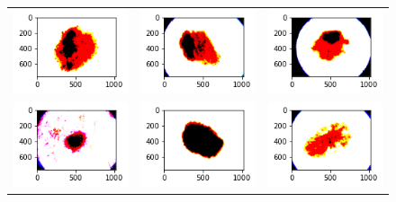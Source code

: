 \begin{figure}[!b]
\begin{tabular}{ccc}
        \includegraphics[width=4cm]{../Plots/THR/filtered_6.png} &
        \includegraphics[width=4cm]{../Plots/THR/filtered_7.png} &
        \includegraphics[width=4cm]{../Plots/THR/filtered_8.png} \\

        \includegraphics[width=4cm]{../Plots/THR/filtered_9.png} &
        \includegraphics[width=4cm]{../Plots/THR/filtered_10.png} &
        \includegraphics[width=4cm]{../Plots/THR/filtered_11.png} \\


\end{tabular}
\end{figure}
